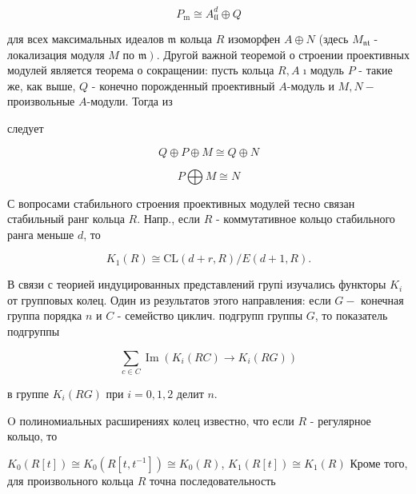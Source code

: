 \documentclass[10pt]{article}
\begin{document}
\[

P_{\mathrm{m}} \cong A_{\mathfrak{l l}}^{d} \oplus Q

\]



для всех максимальных идеалов $\mathfrak{m}$ кольца $R$ изоморфен $A \oplus N$ (здесь $M_{\mathfrak{n t}}$ - локализация модуля $M$ по $\left.\mathfrak{m}\right)$. Другой важной теоремой о строении проективных модулей является теорема о сокращении: пусть кольца $R, A$ ı модуль $P$ - такие же, как выше, $Q$ - конечно порожденный проективный $A$-модуль и $M, N-$ произвольные $A$-модули. Тогда из



следует



\[

Q \oplus P \oplus M \cong Q \oplus N

\]



\[

P \bigoplus M \cong N

\]



С вопросами стабильного строения проективных модулей тесно связан стабильный ранг кольца $R$. Напр., если $R$ - коммутативное кольцо стабильного ранга меньше $d$, то



\[

K_{1}(R) \cong \mathrm{CL}(d+r, R) / E(d+1, R) .

\]



В связи с теорией индуцированных представлений групі изучались функторы $K_{i}$ от групповых колец. Один из результатов этого направления: если $G-$ конечная группа порядка $n$ и $C$ - семейство циклич. подгрупп группы $G$, то показатель подгруппы



\[

\sum_{c \in C} \operatorname{Im}\left(K_{i}(R C) \longrightarrow K_{i}(R G)\right)

\]



в группе $K_{i}(R G)$ при $i=0,1,2$ делит $n$.



O полиномиальных расширениях колец известно, что если $R$ - регулярное кольцо, то



$K_{0}(R[t]) \cong K_{0}\left(R\left[t, t^{-1}\right]\right) \cong K_{0}(R)$, $K_{1}(R[t]) \cong K_{1}(R)$ Кроме того, для произвольного кольца $R$ точна последовательность
\end{document}
